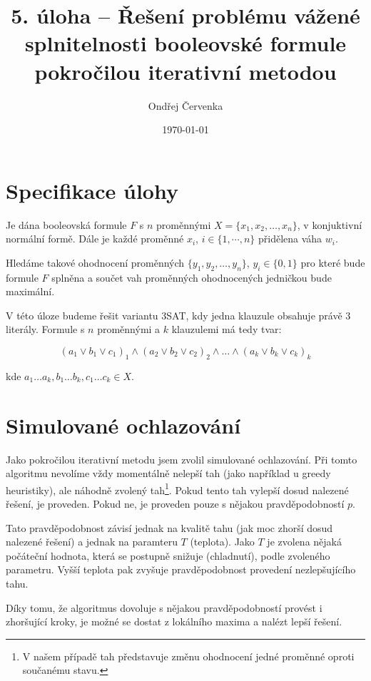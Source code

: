 \documentclass[11pt]{article}
\begin{document}
\title{5. úloha -- Řešení problému vážené splnitelnosti booleovské formule pokročilou iterativní metodou}
\author{Ondřej Červenka}
\date{\today}
\maketitle

\section{Specifikace úlohy}

Je dána booleovská formule $F$ s $n$ proměnnými $X = \{x_1, x_2, \ldots, x_n\}$, v konjuktivní normální formě. Dále je každé proměnné $x_i$, $i \in \{1,\cdots, n\}$ přidělena váha $w_i$.

Hledáme takové ohodnocení proměnných $\{y_1, y_2, \ldots, y_n\}$, $y_i \in \{0,1\} $ pro které bude formule $F$ splněna a součet vah proměnných ohodnocených jedničkou bude maximální.

V této úloze budeme řešit variantu 3SAT, kdy jedna klauzule obsahuje právě 3 literály. Formule s $n$ proměnnými a $k$ klauzulemi má tedy tvar:

$$
(a_1 \vee b_1 \vee c_1)_1 \wedge (a_2 \vee b_2 \vee c_2)_2 \wedge \ldots \wedge (a_k \vee b_k \vee c_k)_k
$$

kde $a_1 \ldots a_k, b_1 \ldots b_k, c_1 \ldots c_k \in X$.

\section{Simulované ochlazování}

Jako pokročilou iterativní metodu jsem zvolil simulované ochlazování. Při tomto algoritmu nevolíme vždy momentálně nelepší tah (jako například u greedy heuristiky), ale náhodně zvolený tah\footnote{V našem případě tah představuje změnu ohodnocení jedné proměnné oproti součanému stavu.}. Pokud tento tah vylepší dosud nalezené řešení, je proveden. Pokud ne, je proveden pouze s nějakou pravděpodobností $p$.

Tato pravděpodobnost závisí jednak na kvalitě tahu (jak moc zhorší dosud nalezené řešení) a jednak na paramteru $T$ (teplota). Jako $T$ je zvolena nějaká počáteční hodnota, která se postupně snižuje (chladnutí), podle zvoleného parametru. Vyšší teplota pak zvyšuje pravděpodobnost provedení nezlepšujícího tahu.

Díky tomu, že algoritmus dovoluje s nějakou pravděpodobností provést i zhoršující kroky, je možné se dostat z lokálního maxima a nalézt lepší řešení.\cite{aibook}
\end{document}

